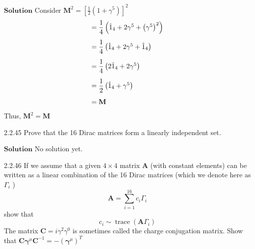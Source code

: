 \documentclass{article}
\begin{document}
\begin{flushleft}
$\boxed{\textbf{Solution}}$ Consider $\mathbf{M}^{2}=\left[\frac{1}{2}\left(1+\gamma^{5}\right)\right]^{2}$
$$
\begin{array}{l}
=\dfrac{1}{4}\left(\hat{1}_{4}+2 \gamma^{5}+\left(\gamma^{5}\right)^{2}\right)\vspace{3mm} \\
=\dfrac{1}{4}\left(\hat{1}_{4}+2 \gamma^{5}+\hat{1}_{4}\right) \vspace{3mm}\\
=\dfrac{1}{4}\left(2\hat{1}_{4}+2 \gamma^{5}\right) \vspace{3mm}\\
=\dfrac{1}{2}\left(\hat{1}_{4}+\gamma^{5}\right) \vspace{3mm}\\
=\mathbf{M}
\end{array}
$$
Thus, $\mathbf{M}^2 = \mathbf{M}$
 

\begin{mybox}{2.2.45}
Prove that the 16 Dirac matrices form a linearly independent set.
\end{mybox}


$\boxed{\textbf{Solution}}$ No solution yet.

\newpage

\begin{mybox}{2.2.46}
If we assume that a given $4 \times 4$ matrix $\mathbf{A}$ (with constant elements) can be written as a linear combination of the 16 Dirac matrices (which we denote here as $\Gamma_{i}$ )
$$
\mathbf{A}=\sum_{i=1}^{16} c_{i} \Gamma_{i}
$$
show that
$$
c_{i} \sim \operatorname{trace}\left(\mathbf{A} \Gamma_{i}\right)
$$
The matrix $\mathbf{C}=i \gamma^{2} \gamma^{0}$ is sometimes called the charge conjugation matrix. Show that $\mathbf{C} \boldsymbol{\gamma}^{\mu} \mathbf{C}^{-1}=-\left(\boldsymbol{\gamma}^{\mu}\right)^{T}$
\end{mybox}


\end{flushleft}
\end{document}
